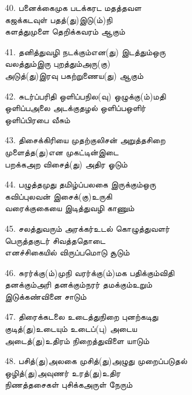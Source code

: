 40. பனைக்கைமுக படக்கரட மதத்தவள\\
         கஜக்கடவுள் பதத்(து)இடு(ம்)நி\\
         களத்துமுளை தெறிக்கவரம் ஆகும் \thiru



41. தனித்துவழி நடக்கும்என(து) இடத்தும்ஒரு\\
         வலத்தும்இரு புறத்தும்அரு(கு)\\
         அடுத்(து)இரவு பகற்றுணைய(து) ஆகும் \thiru



42. சுடர்ப்பரிதி ஒளிப்பநில(வு) ஒழுக்கு(ம்)மதி\\
         ஒளிப்பஅலை அடக்குதழல் ஒளிப்பஒளிர்\\
         ஒளிப்பிரபை வீசும் \thiru



43. திசைக்கிரியை முதற்குலிசன் அறுத்தசிறை\\
         முளைத்த(து)என முகட்டின்இடை\\
         பறக்கஅற விசைத்(து) அதிர ஓடும் \thiru



44. பழுத்தமுது தமிழ்ப்பலகை இருக்கும்ஒரு\\
         கவிப்புலவன் இசைக்(கு)உருகி\\
         வரைக்குகையை இடித்துவழி காணும் \thiru



45. சலத்துவரும் அரக்கர்உடல் கொழுத்துவளர்\\
         பெருத்தகுடர் சிவத்ததொடை\\
         எனச்சிகையில் விருப்பமொடு சூடும் \thiru



46. சுரர்க்கு(ம்)முநி வரர்க்கு(ம்)மக பதிக்கும்விதி\\
         தனக்கும்அரி தனக்கும்நரர் தமக்கும்உறும்\\
         இடுக்கண்வினை சாடும் \thiru



47. திரைக்கடலை உடைத்துநிறை புனற்கடிது\\
         குடித்(து)உடையும் உடைப்(பு) அடைய\\
         அடைத்(து)உதிரம் நிறைத்துவிளை யாடும் \thiru



48. பசித்(து)அலகை முசித்(து)அழுது முறைப்படுதல்\\
         ஒழித்(து)அவுணர் உரத்(து)உதிர\\
         நிணத்தசைகள் புசிக்கஅருள் நேரும் \thiru



